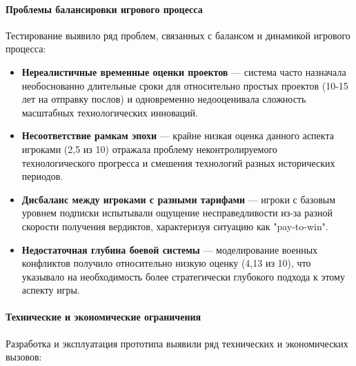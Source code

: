 \paragraph{Проблемы балансировки игрового процесса}

Тестирование выявило ряд проблем, связанных с балансом и динамикой игрового процесса:

\begin{itemize}
    \item \textbf{Нереалистичные временные оценки проектов} — система часто назначала необоснованно длительные сроки для относительно простых проектов (10-15 лет на отправку послов) и одновременно недооценивала сложность масштабных технологических инноваций.

    \item \textbf{Несоответствие рамкам эпохи} — крайне низкая оценка данного аспекта игроками (2,5 из 10) отражала проблему неконтролируемого технологического прогресса и смешения технологий разных исторических периодов.

    \item \textbf{Дисбаланс между игроками с разными тарифами} — игроки с базовым уровнем подписки испытывали ощущение несправедливости из-за разной скорости получения вердиктов, характеризуя ситуацию как "{}pay-to-win"{}.

    \item \textbf{Недостаточная глубина боевой системы} — моделирование военных конфликтов получило относительно низкую оценку (4,13 из 10), что указывало на необходимость более стратегически глубокого подхода к этому аспекту игры.
\end{itemize}

\paragraph{Технические и экономические ограничения}

Разработка и эксплуатация прототипа выявили ряд технических и экономических вызовов:

